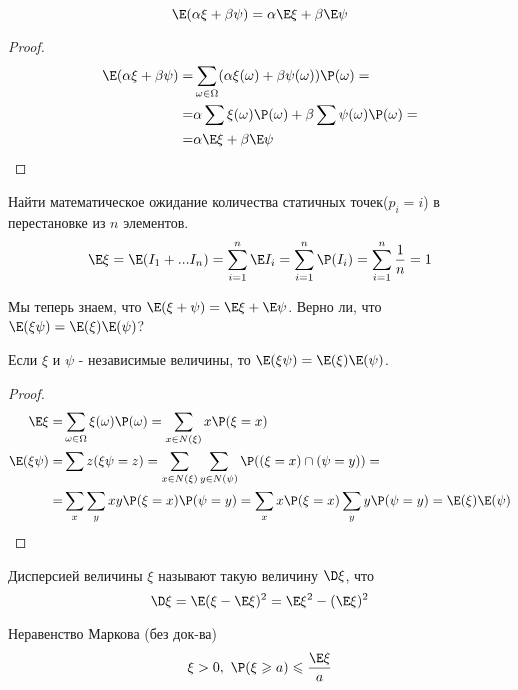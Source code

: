 \begin{theorem}
\[
    \E(\alpha\xi + \beta\psi) = \alpha \E\xi + \beta \E\psi
\]
\end{theorem}

\begin{proof}
    \begin{align*}
        \E(\alpha\xi + \beta\psi) = & \sum_{\omega \in \Omega}(\alpha\xi(\omega) + \beta\psi(\omega))\P(\omega) = \\
        = & \alpha \sum \xi(\omega)\P(\omega) + \beta \sum \psi(\omega)\P(\omega) = \\
        = & \alpha \E\xi + \beta \E\psi
    \end{align*}
\end{proof}

\begin{example}
    Найти математическое ожидание количества статичных точек($p_i = i$) в перестановке из $n$ элементов.
    \[
        \E\xi = \E(I_1 + ... I_n) = \sum_{i=1}^{n}\E I_i = \sum_{i=1}^{n}\P(I_i) = \sum_{i=1}^{n}\frac{1}{n}= 1
    \]
\end{example}

Мы теперь знаем, что $\E(\xi + \psi) = \E\xi + \E\psi$. Верно ли, что $\E(\xi \psi) = \E(\xi)\E(\psi)$? \par

\begin{theorem}
    Если $\xi$ и $\psi$ - независимые величины, то $\E(\xi \psi) = \E(\xi) \E(\psi)$.
\end{theorem}

\begin{proof}
    \begin{align*}
        \E\xi = & \sum_{\omega \in \Omega} \xi(\omega)\P(\omega)=\sum_{x\in N(\xi)}x\P(\xi = x) \\
        \E(\xi \psi) = & \sum z(\xi \psi = z) = \sum_{x \in N(\xi)}\sum_{y \in N(\psi)} \P((\xi = x)\cap (\psi = y)) = \\
        = & \sum_{x}\sum_{y}xy\P(\xi = x)\P(\psi = y) = \sum_{x}x\P(\xi = x) \sum_{y}y\P(\psi = y) = \E(\xi) \E(\psi)
    \end{align*}
\end{proof}

\begin{definition}
    Дисперсией величины $\xi$ называют такую величину $\D \xi$, что 
    \[
        \D\xi=\E(\xi - \E\xi)^2 = \E \xi^2 - (\E \xi)^2
    \]
\end{definition}

\begin{theorem}{\rm Неравенство Маркова (без док-ва)}
    \[
        \xi > 0, \ \P(\xi \geqslant{a}) \leqslant{\frac{\E\xi}{a}}
    \]
\end{theorem}

